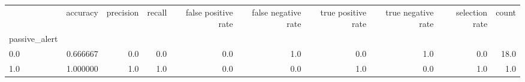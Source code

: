 \begin{tabular}{lrrrrrrrrr}
\toprule
{} &  accuracy &  precision &  recall &  false positive rate &  false negative rate &  true positive rate &  true negative rate &  selection rate &  count \\
passive\_alert &           &            &         &                      &                      &                     &                     &                 &        \\
\midrule
0.0           &  0.666667 &        0.0 &     0.0 &                  0.0 &                  1.0 &                 0.0 &                 1.0 &             0.0 &   18.0 \\
1.0           &  1.000000 &        1.0 &     1.0 &                  0.0 &                  0.0 &                 1.0 &                 0.0 &             1.0 &    1.0 \\
\bottomrule
\end{tabular}
